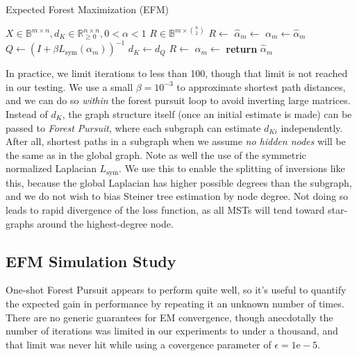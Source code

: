 \documentclass[%
	12pt,
		oneside,
		letterpaper
]{book}
\begin{document}
\begin{algorithm}[htb!]
\caption{Expected Forest Maximization (EFM)}
\label{alg-efm}
\begin{algorithmic}[1]
\Require $X\in \mathbb{B}^{m\times n}, d_K\in \mathbb{R}_{\geq 0}^{n\times n}, 0<\alpha<1$
\Ensure $R \in \mathbb{B}^{m \times {n\choose 2}}$
  \State $R \gets $
    \State $\hat{\alpha}_m\gets$
    \While {$\|\hat{\alpha}-\alpha\|_{\infty}>\epsilon$}
        \State $\alpha_m \gets \hat{\alpha}_m$
        \State $Q \gets (I+\beta L_{\text{sym}}(\alpha_m))^{-1}$
        \State $d_K \gets d_Q$
        \State $R \gets $
        \State $\hat{\alpha}_m\gets$
    \EndWhile
  \State \textbf{return} $\hat{\alpha}_m$
\EndProcedure
\end{algorithmic}
\end{algorithm}

In practice, we limit iterations to less than 100, though that limit is not reached in our testing.
We use a small \(\beta=10^{-3}\) to approximate shortest path distances, and we can do so \emph{within} the forest pursuit loop to avoid inverting large matrices.
Instead of \(d_K\), the graph structure itself (once an initial estimate is made) can be passed to \emph{Forest Pursuit}, where each subgraph can estimate \(d_{Ki}\) independently.
After all, shortest paths in a subgraph when we assume \emph{no hidden nodes} will be the same as in the global graph.
Note as well the use of the symmetric normalized Laplacian \(L_{\text{sym}}\).
We use this to enable the splitting of inversions like this, because the global Laplacian has higher possible degrees than the subgraph, and we do not wish to bias Steiner tree estimation by node degree.
Not doing so leads to rapid divergence of the loss function, as all MSTs will tend toward star-graphs around the highest-degree node.

\subsection{EFM Simulation Study}\label{efm-simulation-study}

One-shot Forest Pursuit appears to perform quite well, so it's useful to quantify the expected gain in performance by repeating it an unknown number of times.
There are no generic guarantees for EM convergence, though anecdotally the number of iterations was limited in our experiments to under a thousand, and that limit was never hit while using a covergence parameter of \(\epsilon=1\mathrm{e}-5\).
\end{document}
